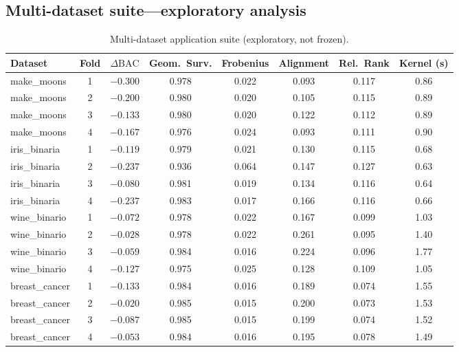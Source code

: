 \documentclass[11pt,a4paper]{article}
\newcommand{\BAC}{\mathrm{BAC}}
\begin{document}
\subsection{Multi-dataset suite---exploratory analysis}
\label{ssec:multidataset}

\begin{table}[htbp]
\centering
\caption{Multi-dataset application suite (exploratory, not frozen).}
\label{tab:multi}
\smallskip
\footnotesize
\begin{tabular}{@{}lccccccc@{}}
\toprule
Dataset & Fold & $\Delta\BAC$ & Geom.\ Surv. & Frobenius & Alignment & Rel.\ Rank & Kernel (s) \\
\midrule
make\_moons   & 1 & $-0.300$ & 0.978 & 0.022 & 0.093 & 0.117 & 0.86 \\
make\_moons   & 2 & $-0.200$ & 0.980 & 0.020 & 0.105 & 0.115 & 0.89 \\
make\_moons   & 3 & $-0.133$ & 0.980 & 0.020 & 0.122 & 0.112 & 0.89 \\
make\_moons   & 4 & $-0.167$ & 0.976 & 0.024 & 0.093 & 0.111 & 0.90 \\
iris\_binaria & 1 & $-0.119$ & 0.979 & 0.021 & 0.130 & 0.115 & 0.68 \\
iris\_binaria & 2 & $-0.237$ & 0.936 & 0.064 & 0.147 & 0.127 & 0.63 \\
iris\_binaria & 3 & $-0.080$ & 0.981 & 0.019 & 0.134 & 0.116 & 0.64 \\
iris\_binaria & 4 & $-0.237$ & 0.983 & 0.017 & 0.166 & 0.116 & 0.66 \\
wine\_binario & 1 & $-0.072$ & 0.978 & 0.022 & 0.167 & 0.099 & 1.03 \\
wine\_binario & 2 & $-0.028$ & 0.978 & 0.022 & 0.261 & 0.095 & 1.40 \\
wine\_binario & 3 & $-0.059$ & 0.984 & 0.016 & 0.224 & 0.096 & 1.77 \\
wine\_binario & 4 & $-0.127$ & 0.975 & 0.025 & 0.128 & 0.109 & 1.05 \\
breast\_cancer & 1 & $-0.133$ & 0.984 & 0.016 & 0.189 & 0.074 & 1.55 \\
breast\_cancer & 2 & $-0.020$ & 0.985 & 0.015 & 0.200 & 0.073 & 1.53 \\
breast\_cancer & 3 & $-0.087$ & 0.985 & 0.015 & 0.199 & 0.074 & 1.52 \\
breast\_cancer & 4 & $-0.053$ & 0.984 & 0.016 & 0.195 & 0.078 & 1.49 \\
\bottomrule
\end{tabular}
\end{table}
\end{document}
